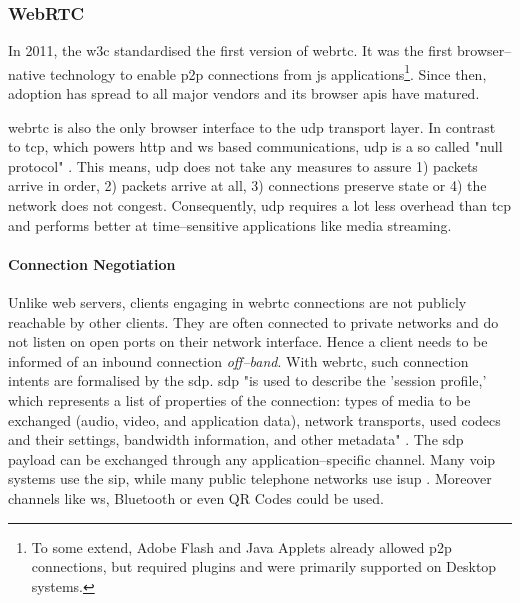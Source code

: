 \subsubsection{WebRTC}

In 2011, the \gls{w3c} standardised the first version of \gls{webrtc}\cite{webrtc-w3c}. It was the first browser–native technology to enable \gls{p2p} connections from \gls{js} applications\footnote{To some extend, Adobe Flash and Java Applets already allowed \gls{p2p} connections, but required plugins and were primarily supported on Desktop systems.}. Since then, adoption has spread to all major vendors and its browser \glspl{api} have matured.

\gls{webrtc} is also the only browser interface to the \gls{udp} transport layer. In contrast to \gls{tcp}, which powers \gls{http} and \gls{ws} based communications, \gls{udp} is a so called "null protocol" \cite[p. 36]{high-performance-browser-networking}. This means, \gls{udp} does not take any measures to assure 1) packets arrive in order, 2) packets arrive at all, 3) connections preserve state or 4) the network does not congest. Consequently, \gls{udp} requires a lot less overhead than \gls{tcp} and performs better at time–sensitive applications like media streaming.

\paragraph{Connection Negotiation}
Unlike web servers, clients engaging in \gls{webrtc} connections are not publicly reachable by other clients. They are often connected to private networks and do not listen on open ports on their network interface.
Hence a client needs to be informed of an inbound connection \textit{off–band}. With \gls{webrtc}, such connection intents are formalised by the \gls{sdp}. \gls{sdp} "is used to describe the 'session profile,' which represents a list of properties of the connection: types of media to be exchanged (audio, video, and application data), network transports, used codecs and their settings, bandwidth information, and other metadata" \cite[p. 323]{high-performance-browser-networking}.
The \gls{sdp} payload \cite[\S5]{sdp-rfc} can be exchanged through any application–specific channel. Many \gls{voip} systems use the \gls{sip}, while many public telephone networks use \gls{isup} \cite[p. 321]{high-performance-browser-networking}. Moreover channels like \gls{ws}, Bluetooth or even QR Codes could be used.

